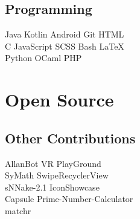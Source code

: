 \documentclass[]{allanwang-resume}
\begin{document}
\begin{minipage}[t][][b]{0.33\textwidth}
	\subsection{Programming}
	Java \tb Kotlin \tb Android \tb Git \tb HTML\\
	C \tb JavaScript \tb SCSS \tb Bash \tb \LaTeX\ \\
	Python \tb OCaml \tb PHP \\
	\sectionsep

	\section{Open Source}
	\subsection{Other Contributions}
	AllanBot \tb VR PlayGround \tb \\
	SyMath \tb SwipeRecyclerView \tb \\
	sNNake-2.1 \tb IconShowcase \tb \\
	Capsule \tb Prime-Number-Calculator \tb \\
	matchr 

\end{minipage}
\hfill
\end{document}
